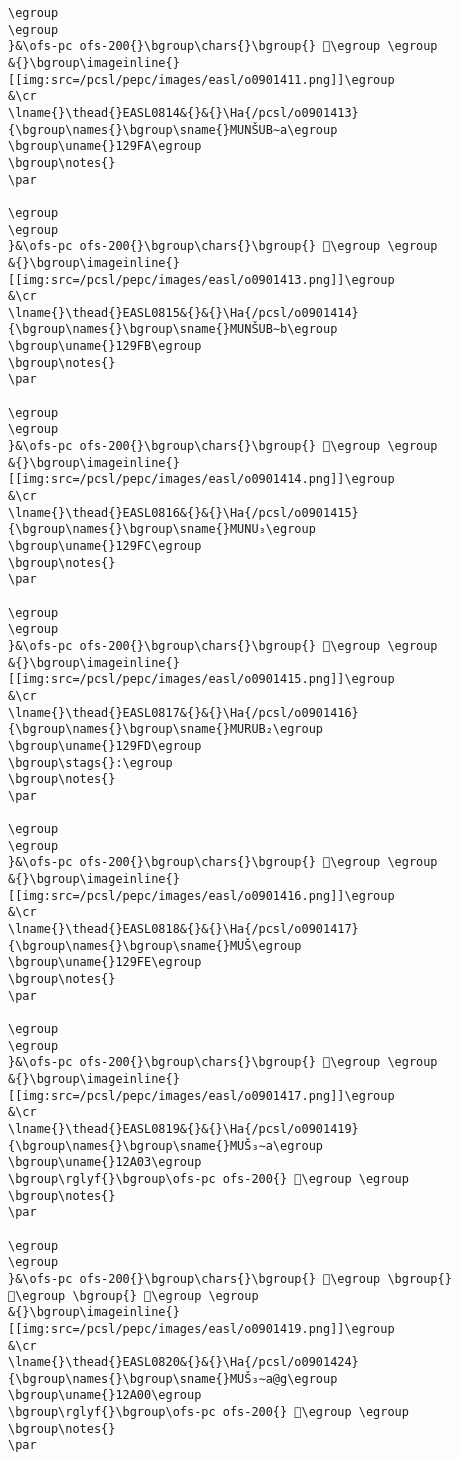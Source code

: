 \begin{verbatim}
\egroup
\egroup
}&\ofs-pc ofs-200{}\bgroup\chars{}\bgroup{} 𒧹\egroup \egroup
&{}\bgroup\imageinline{}[[img:src=/pcsl/pepc/images/easl/o0901411.png]]\egroup
&\cr
\lname{}\thead{}EASL0814&{}&{}\Ha{/pcsl/o0901413}{\bgroup\names{}\bgroup\sname{}MUNŠUB∼a\egroup
\bgroup\uname{}129FA\egroup
\bgroup\notes{}
\par 

\egroup
\egroup
}&\ofs-pc ofs-200{}\bgroup\chars{}\bgroup{} 𒧺\egroup \egroup
&{}\bgroup\imageinline{}[[img:src=/pcsl/pepc/images/easl/o0901413.png]]\egroup
&\cr
\lname{}\thead{}EASL0815&{}&{}\Ha{/pcsl/o0901414}{\bgroup\names{}\bgroup\sname{}MUNŠUB∼b\egroup
\bgroup\uname{}129FB\egroup
\bgroup\notes{}
\par 

\egroup
\egroup
}&\ofs-pc ofs-200{}\bgroup\chars{}\bgroup{} 𒧻\egroup \egroup
&{}\bgroup\imageinline{}[[img:src=/pcsl/pepc/images/easl/o0901414.png]]\egroup
&\cr
\lname{}\thead{}EASL0816&{}&{}\Ha{/pcsl/o0901415}{\bgroup\names{}\bgroup\sname{}MUNU₃\egroup
\bgroup\uname{}129FC\egroup
\bgroup\notes{}
\par 

\egroup
\egroup
}&\ofs-pc ofs-200{}\bgroup\chars{}\bgroup{} 𒧼\egroup \egroup
&{}\bgroup\imageinline{}[[img:src=/pcsl/pepc/images/easl/o0901415.png]]\egroup
&\cr
\lname{}\thead{}EASL0817&{}&{}\Ha{/pcsl/o0901416}{\bgroup\names{}\bgroup\sname{}MURUB₂\egroup
\bgroup\uname{}129FD\egroup
\bgroup\stags{}:\egroup
\bgroup\notes{}
\par 

\egroup
\egroup
}&\ofs-pc ofs-200{}\bgroup\chars{}\bgroup{} 𒧽\egroup \egroup
&{}\bgroup\imageinline{}[[img:src=/pcsl/pepc/images/easl/o0901416.png]]\egroup
&\cr
\lname{}\thead{}EASL0818&{}&{}\Ha{/pcsl/o0901417}{\bgroup\names{}\bgroup\sname{}MUŠ\egroup
\bgroup\uname{}129FE\egroup
\bgroup\notes{}
\par 

\egroup
\egroup
}&\ofs-pc ofs-200{}\bgroup\chars{}\bgroup{} 𒧾\egroup \egroup
&{}\bgroup\imageinline{}[[img:src=/pcsl/pepc/images/easl/o0901417.png]]\egroup
&\cr
\lname{}\thead{}EASL0819&{}&{}\Ha{/pcsl/o0901419}{\bgroup\names{}\bgroup\sname{}MUŠ₃∼a\egroup
\bgroup\uname{}12A03\egroup
\bgroup\rglyf{}\bgroup\ofs-pc ofs-200{} 𒨃\egroup \egroup
\bgroup\notes{}
\par 

\egroup
\egroup
}&\ofs-pc ofs-200{}\bgroup\chars{}\bgroup{} 𒧿\egroup \bgroup{} 𒨂\egroup \bgroup{} 𒨃\egroup \egroup
&{}\bgroup\imageinline{}[[img:src=/pcsl/pepc/images/easl/o0901419.png]]\egroup
&\cr
\lname{}\thead{}EASL0820&{}&{}\Ha{/pcsl/o0901424}{\bgroup\names{}\bgroup\sname{}MUŠ₃∼a@g\egroup
\bgroup\uname{}12A00\egroup
\bgroup\rglyf{}\bgroup\ofs-pc ofs-200{} 𒨀\egroup \egroup
\bgroup\notes{}
\par 


\end{verbatim}
